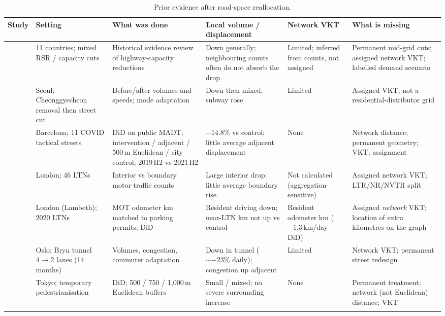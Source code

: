 \documentclass[a4paper,fleqn]{cas-dc}
\begin{document}
\begin{table}
\caption{Prior evidence after road-space reallocation.}
\label{tab:lit}
\centering
\scriptsize
\setlength{\tabcolsep}{3.2pt}
\begin{tabular}{@{}Y{2.15cm}Y{2.35cm}Y{2.55cm}Y{2.15cm}Y{2.15cm}Y{2.55cm}@{}}
\toprule
Study & Setting & What was done & Local volume / displacement & Network VKT & What is missing \\
\midrule
\citet{Cairns1998,Cairns2002} &
11 countries; mixed RSR / capacity cuts &
Historical evidence review of highway-capacity reductions &
Down generally; neighbouring counts often do not absorb the drop &
Limited; inferred from counts, not assigned &
Permanent mid-grid cuts; assigned network VKT; labelled demand scenario \\
\addlinespace
\citet{Chung2012} &
Seoul; Cheonggyecheon removal then street cut &
Before/after volumes and speeds; mode adaptation &
Down then mixed; subway rose &
Limited &
Assigned VKT; not a residential-distributor grid \\
\addlinespace
\citet{NelloDeakin2022} &
Barcelona; 11 COVID tactical streets &
DiD on public MADT; intervention / adjacent / 500\,m Euclidean / city control; 2019\,H2 vs 2021\,H2 &
$-14.8\%$ vs control; little average adjacent displacement &
None &
Network distance; permanent geometry; VKT; assignment \\
\addlinespace
\citet{Thomas2024} &
London; 46 LTNs &
Interior vs boundary motor-traffic counts &
Large interior drop; little average boundary rise &
Not calculated (aggregation-sensitive) &
Assigned network VKT; LTR/NR/NVTR split \\
\addlinespace
\citet{Goodman2023} &
London (Lambeth); 2020 LTNs &
MOT odometer km matched to parking permits; DiD &
Resident driving down; near-LTN km not up vs control &
Resident odometer km ($-1.3$\,km/day DiD) &
Assigned \emph{network} VKT; location of extra kilometres on the graph \\
\addlinespace
\citet{Tennoy2021} &
Oslo; Bryn tunnel $4\to 2$ lanes (14 months) &
Volumes, congestion, commuter adaptation &
Down in tunnel ($\sim-23\%$ daily); congestion up adjacent &
Limited &
Network VKT; permanent street redesign \\
\addlinespace
\citet{Parady2025} &
Tokyo; temporary pedestrianisation &
DiD; 500 / 750 / 1{,}000\,m Euclidean buffers &
Small / mixed; no severe surrounding increase &
None &
Permanent treatment; network (not Euclidean) distance; VKT \\
\addlinespace
\citet{Koorey2025} &

\end{tabular}
\end{table}
\end{document}
